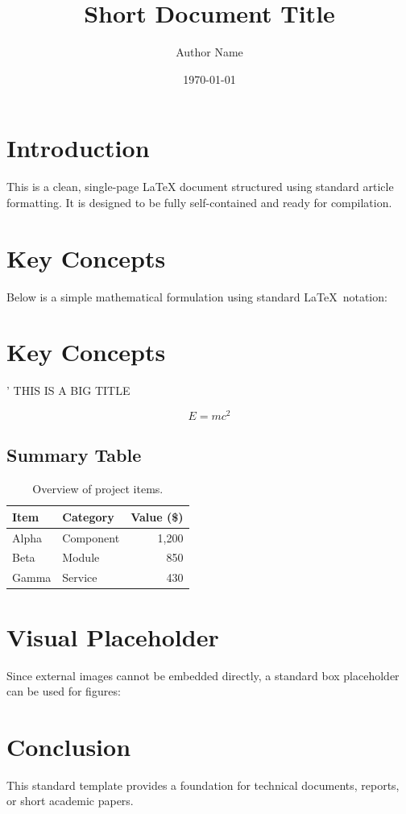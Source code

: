 \documentclass[11pt, a4paper]{article}
\title{\textbf{\color{primary} Short Document Title}}
\author{Author Name}
\date{\today}
\begin{document}
\maketitle

\section{Introduction}
This is a clean, single-page LaTeX document structured using standard article formatting. It is designed to be fully self-contained and ready for compilation.

\section{Key Concepts}
Below is a simple mathematical formulation using standard \LaTeX\ notation:

\section{Key Concepts}'
THIS IS A BIG TITLE

\begin{equation}
    E = mc^2
\end{equation}

\subsection{Summary Table}
\begin{table}[h]
    \centering
    \begin{tabular}{llr}
        \toprule
        \textbf{Item} & \textbf{Category} & \textbf{Value (\$)} \\
        \midrule
        Alpha & Component & 1,200 \\
        Beta & Module & 850 \\
        Gamma & Service & 430 \\
        \bottomrule
    \end{tabular}
    \caption{Overview of project items.}
\end{table}

\section{Visual Placeholder}
Since external images cannot be embedded directly, a standard box placeholder can be used for figures:

\vspace{0.5cm}
\begin{center}
\end{center}
\vspace{0.5cm}

\section{Conclusion}
This standard template provides a foundation for technical documents, reports, or short academic papers.
\end{document}
